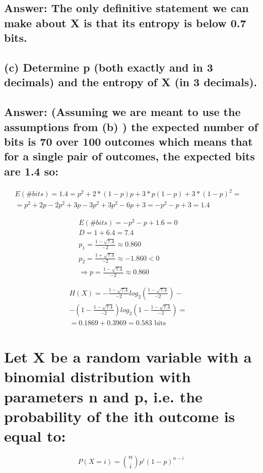 \documentclass[15px]{article}
\begin{document}
\subsection*{Answer: The only definitive statement we can make about X is
that its entropy is below 0.7 bits.}

\subsection*{\normalfont (c) Determine p (both exactly and in 3 decimals) and the entropy of X (in 3 decimals).}

\subsection*{Answer: (Assuming we are meant to use the assumptions from (b) ) the expected number of bits is 70 over 100 outcomes which means that for a single pair of outcomes, the expected bits are 1.4 so:}

\begin{equation}
\begin{split}
E(\#bits) = 1.4 = p^2+2*(1-p)p+3*p(1-p)+3*(1-p)^2 = & \\
= p^2+2p-2p^2+3p-3p^2+3p^2-6p+3 = -p^2-p+3 = 1.4
\end{split}
\end{equation}

\begin{equation}
\begin{split}
E(\#bits) = -p^2-p+1.6 = 0 & \\
D = 1+6.4 = 7.4 & \\
p_1 = \frac{1-\sqrt{7.4}}{-2} \approx 0.860 & \\
p_2 = \frac{1+\sqrt{7.4}}{-2} \approx -1.860 < 0 & \\
\Longrightarrow p = \frac{1-\sqrt{7.4}}{-2} \approx 0.860
\end{split}
\end{equation}

\begin{equation}
\begin{split}
H(X) = -\frac{1-\sqrt{7.4}}{-2}log_2(\frac{1-\sqrt{7.4}}{-2})- & \\ - (1-\frac{1-\sqrt{7.4}}{-2})log_2(1-\frac{1-\sqrt{7.4}}{-2}) = & \\ = 0.1869 + 0.3969 = 0.583 \text{ bits}
\end{split}
\end{equation}

\section{Let X be a random variable with a binomial distribution with parameters n and p, i.e. the probability of the ith outcome is equal to:} 
\begin{equation}
P(X = i) = \binom{n}{i}p^i(1-p)^{n-i}    
\end{equation}
\end{document}
